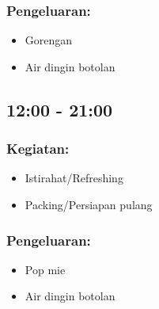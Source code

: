 \documentclass[12pt,]{article}
\begin{document}
	\subsubsection{Pengeluaran:}
	\begin{itemize}
		\item Gorengan
		\item Air dingin botolan
	\end{itemize}

	\subsection{12:00 - 21:00}
	\subsubsection{Kegiatan:}
	\begin{itemize}
		\item Istirahat/Refreshing
		\item Packing/Persiapan pulang
	\end{itemize}

	\subsubsection{Pengeluaran:}
	\begin{itemize}
		\item Pop mie
		\item Air dingin botolan 
	\end{itemize}
\end{document}
